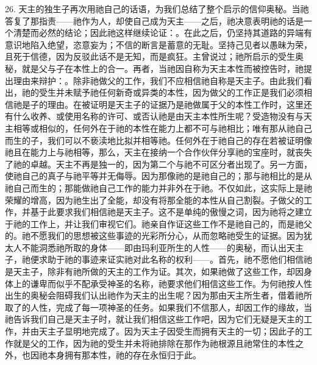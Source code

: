 26. 天主的独生子再次用祂自己的话语，为我们总结了整个启示的信仰奥秘。当祂答复了那指责——祂作为人，却使自己成为天主——之后，祂决意表明祂的话是一个清楚而必然的结论；因此祂这样继续论证：。在此之后，仍坚持其道路的异端有意识地陷入绝望，恣意妄为；不信的断言是蓄意的无耻。坚持己见者以愚昧为荣，且死于信德，因为反驳此话不是无知，而是疯狂。主曾说过；祂所启示的受生奥秘，就是父与子在本性上的合一。再者，当祂因自称为天主本性而被控告时，祂提出理由来辩护：。除非祂做父的工作，我们不应相信祂自称是天主子。由此我们看出，祂的受生并未赋予祂任何新奇或异类的本性，因为做父的工作正是我们必须相信祂是子的理由。在被证明是天主子的证据乃是祂做属于父的本性工作时，这里还有什么收养、或使用名称的许可、或否认祂是由天主本性所生呢？受造物没有与天主相等或相似的，任何外在于祂的本性在能力上都不可与祂相比；唯有那从祂自己而生的子，我们可以不亵渎地比拟并相等祂。任何外在于祂自己的存在若被证明像祂且在能力上与祂相等，那么，天主在接纳一个合作伙伴分享祂的宝座时，就丧失了祂的卓越。天主不再是独一的，因为第二个与祂不可区分者出现了。另一方面，使祂自己的真子与祂平等并无侮辱。因为那像祂的是祂自己的；那与祂相比的是从祂自己而生的；那能做祂自己工作的能力并非外在于祂。不仅如此，这实际上是祂荣耀的增高，因为祂生出了全能，却没有将那全能的本性从自己割裂。子做父的工作，并基于此要求我们相信祂是天主子。这不是单纯的傲慢之词，因为祂将之建立于祂的工作上，并让我们审视它们。祂亲自作证这些工作不是祂自己的，而是祂父的。祂不愿我们的思想被这些事迹的光彩所分心，从而忽略祂受生的证据。因为犹太人不能洞悉祂所取的身体——即由玛利亚所生的人性——的奥秘，而认出天主子，祂便求助于祂的事迹来证实祂对此名称的权利——。首先，祂不愿他们相信祂是天主子，除非有祂所做的天主的工作为证。其次，如果祂做了这些工作，却因身体上的谦卑而似乎不配承受神圣的名称，祂要求他们相信这些工作。为何祂按人性出生的奥秘会阻碍我们认出祂作为天主的出生呢？因为那由天主所生者，借着祂所取了的人性，完成了每一项神圣的任务。如果我们不信那人，却因工作的缘故，当祂告诉我们自己是天主子时，就让我们相信这些工作吧，因为它们无疑是天主的工作，并由天主子显明地完成了。因为天主子因受生而拥有天主的一切；因此子的工作就是父的工作，因为祂的受生并未将祂排除在那作为祂根源且祂常住的本性之外，也因祂本身拥有那本性，祂的存在永恒归于此。\par

